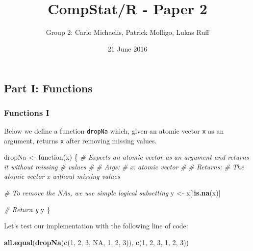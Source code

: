 \documentclass[11,]{article}
\title{CompStat/R - Paper 2}
\author{Group 2: Carlo Michaelis, Patrick Molligo, Lukas Ruff}
\date{21 June 2016}
\newenvironment{Shaded}{\begin{snugshade}}{\end{snugshade}}
\newcommand{\KeywordTok}[1]{\textcolor[rgb]{0.13,0.29,0.53}{\textbf{{#1}}}}
\newcommand{\DecValTok}[1]{\textcolor[rgb]{0.00,0.00,0.81}{{#1}}}
\newcommand{\StringTok}[1]{\textcolor[rgb]{0.31,0.60,0.02}{{#1}}}
\newcommand{\CommentTok}[1]{\textcolor[rgb]{0.56,0.35,0.01}{\textit{{#1}}}}
\newcommand{\OtherTok}[1]{\textcolor[rgb]{0.56,0.35,0.01}{{#1}}}
\newcommand{\NormalTok}[1]{{#1}}
\begin{document}
\maketitle

\subsection{Part I: Functions}\label{part-i-functions}

\subsubsection{Functions I}\label{functions-i}

Below we define a function \texttt{dropNa} which, given an atomic vector
\texttt{x} as an argument, returns \texttt{x} after removing missing
values.

\begin{Shaded}
\begin{Highlighting}[]
\NormalTok{dropNa <-}\StringTok{ }\NormalTok{function(x) \{}
  \CommentTok{# Expects an atomic vector as an argument and returns it without missing}
  \CommentTok{# values}
  \CommentTok{# }
  \CommentTok{# Args:}
  \CommentTok{#   x: atomic vector}
  \CommentTok{#}
  \CommentTok{# Returns:}
  \CommentTok{#   The atomic vector x without missing values}
  
  \CommentTok{# To remove the NAs, we use simple logical subsetting}
  \NormalTok{y <-}\StringTok{ }\NormalTok{x[!}\KeywordTok{is.na}\NormalTok{(x)]}
  
  \CommentTok{# Return y}
  \NormalTok{y}
\NormalTok{\}}
\end{Highlighting}
\end{Shaded}

Let's test our implementation with the following line of code:

\begin{Shaded}
\begin{Highlighting}[]
\KeywordTok{all.equal}\NormalTok{(}\KeywordTok{dropNa}\NormalTok{(}\KeywordTok{c}\NormalTok{(}\DecValTok{1}\NormalTok{, }\DecValTok{2}\NormalTok{, }\DecValTok{3}\NormalTok{, }\OtherTok{NA}\NormalTok{, }\DecValTok{1}\NormalTok{, }\DecValTok{2}\NormalTok{, }\DecValTok{3}\NormalTok{)), }\KeywordTok{c}\NormalTok{(}\DecValTok{1}\NormalTok{, }\DecValTok{2}\NormalTok{, }\DecValTok{3}\NormalTok{, }\DecValTok{1}\NormalTok{, }\DecValTok{2}\NormalTok{, }\DecValTok{3}\NormalTok{))}
\end{Highlighting}
\end{Shaded}
\end{document}
